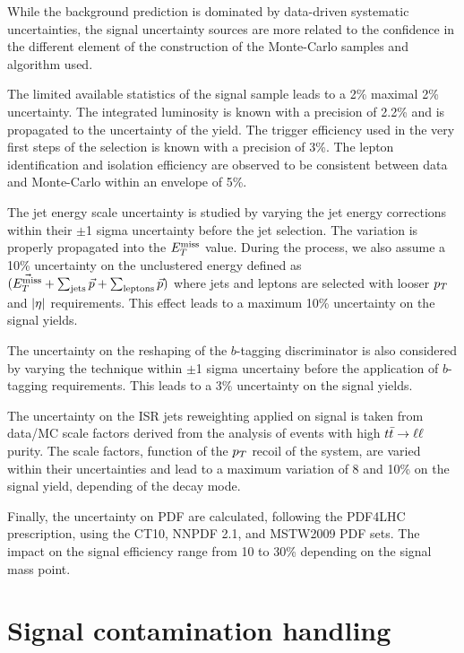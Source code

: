         While the background prediction is dominated by data-driven systematic
        uncertainties, the signal uncertainty sources are more related to the
        confidence in the different element of the construction of the Monte-Carlo
        samples and algorithm used.

        The limited available statistics of the signal sample leads to a 2\% maximal
        2\% uncertainty. The integrated luminosity is known with a precision of 2.2\%
        and is propagated to the uncertainty of the yield. The trigger efficiency
        used in the very first steps of the selection is known with a precision of 3\%.
        The lepton identification and isolation efficiency are observed to be consistent
        between data and Monte-Carlo within an envelope of 5\%.

        The jet energy scale uncertainty is studied by varying the jet energy corrections
        within their $\pm$1 sigma uncertainty before the jet selection. The variation is
        properly propagated into the $E_T^\text{miss}$ value. During the process, we also assume a
        10\% uncertainty on the unclustered energy defined as $(\vec{E_T^\text{miss}} + \sum_\text{jets}
        \vec{p} + \sum_\text{leptons} \vec{p})$ where jets and leptons are selected with looser
        $p_T$ and $\left| \eta \right|$ requirements. This effect leads to a maximum 10\% uncertainty on
        the signal yields.

        The uncertainty on the reshaping of the $b$-tagging discriminator is also considered
        by varying the technique within $\pm$1 sigma uncertainy before the application of
        $b$-tagging requirements. This leads to a 3\% uncertainty on the signal yields.

        The uncertainty on the ISR jets reweighting applied on signal is taken from data/MC
        scale factors derived from the analysis of events with high $t\bar{t} \rightarrow \ell \ell$ purity. The
        scale factors, function of the $p_T$ recoil of the system, are varied within their
        uncertainties and lead to a maximum variation of 8 and 10\% on the signal yield, depending
        of the decay mode.

        Finally, the uncertainty on PDF are calculated, following the PDF4LHC prescription,
        using the CT10, NNPDF 2.1, and MSTW2009 PDF sets.  The impact on the
        signal efficiency range from 10 to 30\% depending on the signal mass point.

    \section{Signal contamination handling}

